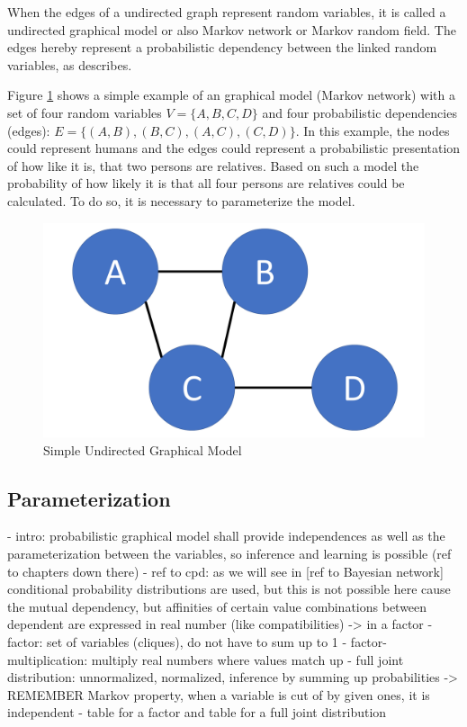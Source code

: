 When the edges of a undirected graph represent random variables, it is called a undirected graphical model or also Markov network or Markov random field. The edges hereby represent a probabilistic dependency between the linked random variables, as \cite{kindermann1980markov} describes.

Figure \ref{fig:basic} shows a simple example of an graphical model (Markov network) with a set of four random variables $V=\{A,B,C,D\}$ and four probabilistic dependencies (edges): $E=\{(A,B),(B,C),(A,C),(C,D)\}$. In this example, the nodes could represent humans and the edges could represent a probabilistic presentation of how like it is, that two persons are relatives. Based on such a model the probability of how likely it is that all four persons are relatives could be calculated. To do so, it is necessary to parameterize the model.

\begin{figure}[htpb]
  \centering
  	\includegraphics[scale=0.3]{img/basic.pdf} 
  \caption{Simple Undirected Graphical Model}
  \label{fig:basic}
\end{figure}

\subsection{Parameterization}

- intro: probabilistic graphical model shall provide independences as well as the parameterization between the variables, so inference and learning is possible (ref to chapters down there)
- ref to cpd: as we will see in [ref to Bayesian network] conditional probability distributions are used, but this is not possible here cause the mutual dependency, but affinities of certain value combinations between dependent are expressed in real number (like compatibilities) -> in a factor
- factor: set of variables (cliques), do not have to sum up to 1
- factor-multiplication: multiply real numbers where values match up
- full joint distribution: unnormalized, normalized, inference by summing up probabilities -> REMEMBER Markov property, when a variable is cut of by given ones, it is independent
- table for a factor and table for a full joint distribution

